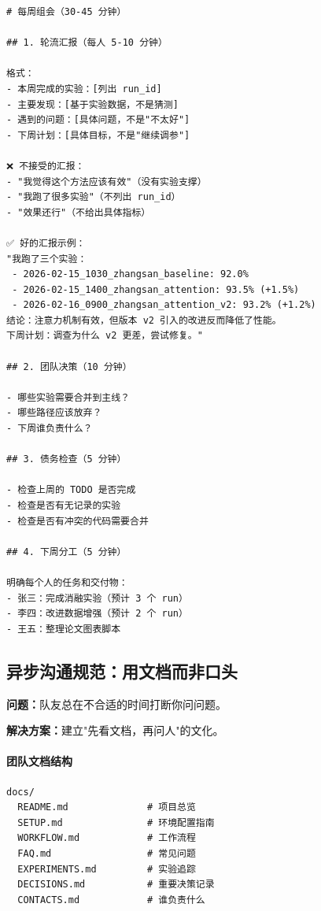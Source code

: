 \begin{verbatim}
# 每周组会（30-45 分钟）

## 1. 轮流汇报（每人 5-10 分钟）

格式：
- 本周完成的实验：[列出 run_id]
- 主要发现：[基于实验数据，不是猜测]
- 遇到的问题：[具体问题，不是"不太好"]
- 下周计划：[具体目标，不是"继续调参"]

❌ 不接受的汇报：
- "我觉得这个方法应该有效"（没有实验支撑）
- "我跑了很多实验"（不列出 run_id）
- "效果还行"（不给出具体指标）

✅ 好的汇报示例：
"我跑了三个实验：
 - 2026-02-15_1030_zhangsan_baseline: 92.0%
 - 2026-02-15_1400_zhangsan_attention: 93.5% (+1.5%)
 - 2026-02-16_0900_zhangsan_attention_v2: 93.2% (+1.2%)
结论：注意力机制有效，但版本 v2 引入的改进反而降低了性能。
下周计划：调查为什么 v2 更差，尝试修复。"

## 2. 团队决策（10 分钟）

- 哪些实验需要合并到主线？
- 哪些路径应该放弃？
- 下周谁负责什么？

## 3. 债务检查（5 分钟）

- 检查上周的 TODO 是否完成
- 检查是否有无记录的实验
- 检查是否有冲突的代码需要合并

## 4. 下周分工（5 分钟）

明确每个人的任务和交付物：
- 张三：完成消融实验（预计 3 个 run）
- 李四：改进数据增强（预计 2 个 run）
- 王五：整理论文图表脚本
\end{verbatim}

\subsection{异步沟通规范：用文档而非口头}

\textbf{问题：}队友总在不合适的时间打断你问问题。

\textbf{解决方案：}建立"先看文档，再问人"的文化。

\paragraph{团队文档结构}

\begin{verbatim}
docs/
  README.md              # 项目总览
  SETUP.md               # 环境配置指南
  WORKFLOW.md            # 工作流程
  FAQ.md                 # 常见问题
  EXPERIMENTS.md         # 实验追踪
  DECISIONS.md           # 重要决策记录
  CONTACTS.md            # 谁负责什么
\end{verbatim}


